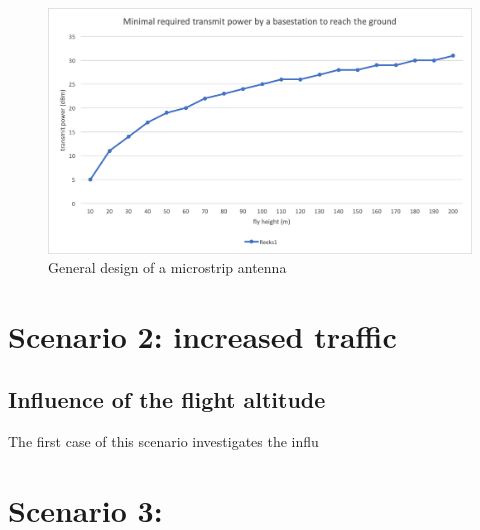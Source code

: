 \begin{figure}[h!]
  \includegraphics[width=\textwidth]{../results/s1/ptx-fh.png}
  \caption{General design of a microstrip antenna}
  \label{fig:ptxfh}
\end{figure}

\section{Scenario 2: increased traffic}

\subsection{Influence of the flight altitude}
The first case of this scenario investigates the influ

\section{Scenario 3:}